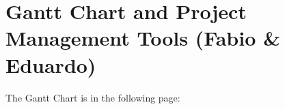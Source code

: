  \section{Gantt Chart and Project Management Tools (Fabio \& Eduardo)}
 The Gantt Chart is in the following page:
 